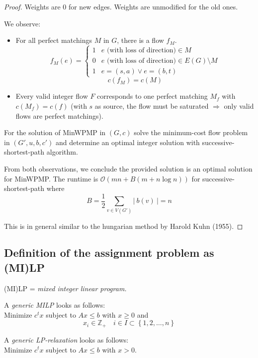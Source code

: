 \documentclass{article}
\newcommand{\card}[1]{\left|\:\!#1\:\!\right|}
\newcommand{\set}[1]{\left\{#1\right\}}
\begin{document}
\begin{proof}
  Weights are 0 for new edges. Weights are unmodified for the old ones.

  We observe:
  \begin{itemize}
    \item For all perfect matchings $M$ in $G$, there is a flow $f_M$.
      \[
        f_M(e) = \begin{cases}
          1 & e \text{ (with loss of direction)} \in M \\
          0 & e \text{ (with loss of direction)} \in E(G) \setminus M \\
          1 & e = (s, a) \lor e = (b, t)
        \end{cases}
      \]
      \[ c(f_M) = c(M) \]

    \item Every valid integer flow $F$ corresponds to one perfect matching $M_f$ with $c(M_f) = c(f)$ (with $s$ as source, the flow must be saturated $\Rightarrow$ only valid flows are perfect matchings).
  \end{itemize}

  For the solution of MinWPMP in $(G, c)$ solve the minimum-cost flow problem in $(G', u, b, c')$ and determine an optimal integer solution with successive-shortest-path algorithm.

  From both observations, we conclude the provided solution is an optimal solution for MinWPMP.
  The runtime is $\mathcal{O}(mn + B(m + n\log{n}))$ for successive-shortest-path where
  \[ B = \frac12 \sum_{v \in V(G')} \card{b(v)} = n \]

  This is in general similar to the hungarian method by Harold Kuhn (1955).
\end{proof}

\subsection{Definition of the assignment problem as (MI)LP}

(MI)LP = \textit{mixed integer linear program.}

\begin{framed}
  A \emph{generic MILP} looks as follows: \\
  Minimize $c^t x$ subject to $Ax \leq b$ with $x \geq 0$ and
  \[ x_i \in \mathbb{Z}_+ \quad i \in I \subset \set{1, 2, \ldots, n} \]
\end{framed}
\begin{framed}
  A \emph{generic LP-relaxation} looks as follows: \\
  Minimize $c^t x$ subject to $Ax \leq b$ with $x > 0$.
\end{framed}
\end{document}
